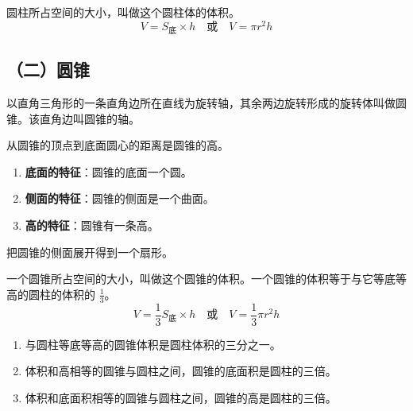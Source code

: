 \begin{theorem}[圆柱的体积]
    圆柱所占空间的大小，叫做这个圆柱体的体积。
    $$ V = S_{底} \times h \quad \text{或} \quad V = \pi r^2 h $$
\end{theorem}

\subsection*{（二）圆锥}
\begin{definition}[圆锥]
    以直角三角形的一条直角边所在直线为旋转轴，其余两边旋转形成的旋转体叫做圆锥。该直角边叫圆锥的轴。
\end{definition}

\begin{definition}[圆锥的高]
    从圆锥的顶点到底面圆心的距离是圆锥的高。
\end{definition}

\begin{definition}[圆锥的特征]
    \begin{enumerate}
        \item \textbf{底面的特征}：圆锥的底面一个圆。
        \item \textbf{侧面的特征}：圆锥的侧面是一个曲面。
        \item \textbf{高的特征}：圆锥有一条高。
    \end{enumerate}
\end{definition}

\begin{theorem}[圆锥的侧面展开图]
    把圆锥的侧面展开得到一个扇形。
\end{theorem}

\begin{theorem}[圆锥的体积]
    一个圆锥所占空间的大小，叫做这个圆锥的体积。一个圆锥的体积等于与它等底等高的圆柱的体积的 $\frac{1}{3}$。
    $$ V = \frac{1}{3} S_{底} \times h \quad \text{或} \quad V = \frac{1}{3} \pi r^2 h $$
\end{theorem}

\begin{theorem}[圆柱与圆锥的关系]
    \begin{enumerate}
        \item 与圆柱等底等高的圆锥体积是圆柱体积的三分之一。
        \item 体积和高相等的圆锥与圆柱之间，圆锥的底面积是圆柱的三倍。
        \item 体积和底面积相等的圆锥与圆柱之间，圆锥的高是圆柱的三倍。
    \end{enumerate}
\end{theorem}


